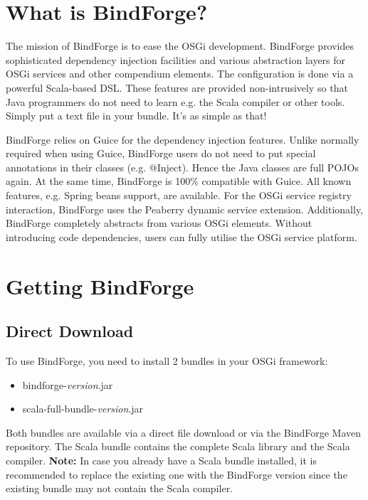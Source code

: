 
\section{What is BindForge?}

The mission of BindForge is to ease the OSGi development. BindForge provides sophisticated dependency injection facilities and various abstraction layers for OSGi services and other compendium elements. The configuration is done via a powerful Scala-based DSL. These features are provided non-intrusively so that Java programmers do not need to learn e.g. the Scala compiler or other tools. Simply put a text file in your bundle. It's as simple as that!

BindForge relies on Guice for the dependency injection features. Unlike normally required when using Guice, BindForge users do not need to put special annotations in their classes (e.g. @Inject). Hence the Java classes are full POJOs again. At the same time, BindForge is 100\% compatible with Guice. All known features, e.g. Spring beans support, are available. For the OSGi service registry interaction, BindForge uses the Peaberry dynamic service extension. Additionally, BindForge completely abstracts from various OSGi elements. Without introducing code dependencies, users can fully utilise the OSGi service platform. 


\section{Getting BindForge}

\subsection{Direct Download}

To use BindForge, you need to install 2 bundles in your OSGi framework:

\begin{itemize}
 \item bindforge-\textit{version}.jar
 \item scala-full-bundle-\textit{version}.jar
\end{itemize}

Both bundles are available via a direct file download or via the BindForge Maven repository. The Scala bundle contains the complete Scala library and the Scala compiler. \textbf{Note:} In case you already have a Scala bundle installed, it is recommended to replace the existing one with the BindForge version since the existing bundle may not contain the Scala compiler.

